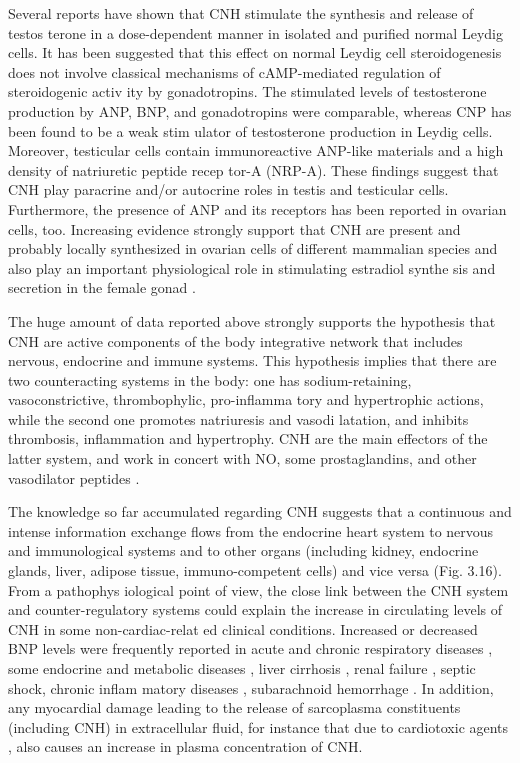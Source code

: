 \documentclass[14pt,a4paper,onecolumn]{extarticle}
\begin{document}
Several reports have shown that CNH stimulate the synthesis and release of testos terone in a dose-dependent manner in isolated and purified normal Leydig cells. It has been suggested that this effect on normal Leydig cell steroidogenesis does not involve classical mechanisms of cAMP-mediated regulation of steroidogenic activ ity by gonadotropins. The stimulated levels of testosterone production by ANP, BNP, and gonadotropins were comparable, whereas CNP has been found to be a weak stim ulator of testosterone production in Leydig cells. Moreover, testicular cells contain immunoreactive ANP-like materials and a high density of natriuretic peptide recep tor-A (NRP-A). These findings suggest that CNH play paracrine and/or autocrine roles in testis and testicular cells. Furthermore, the presence of ANP and its receptors has been reported in ovarian cells, too. Increasing evidence strongly support that CNH are present and probably locally synthesized in ovarian cells of different mammalian species and also play an important physiological role in stimulating estradiol synthe sis and secretion in the female gonad \citep{112}.

The huge amount of data reported above strongly supports the hypothesis that CNH are active components of the body integrative network that includes nervous, endocrine and immune systems. This hypothesis implies that there are two counteracting systems in the body: one has sodium-retaining, vasoconstrictive, thrombophylic, pro-inflamma tory and hypertrophic actions, while the second one promotes natriuresis and vasodi latation, and inhibits thrombosis, inflammation and hypertrophy. CNH are the main effectors of the latter system, and work in concert with NO, some prostaglandins, and other vasodilator peptides \citep{119} \citep{120}.

The knowledge so far accumulated regarding CNH suggests that a continuous and intense information exchange flows from the endocrine heart system to nervous and immunological systems and to other organs (including kidney, endocrine glands, liver, adipose tissue, immuno-competent cells) and vice versa (Fig. 3.16). From a pathophys iological point of view, the close link between the CNH system and counter-regulatory systems could explain the increase in circulating levels of CNH in some non-cardiac-relat ed clinical conditions. Increased or decreased BNP levels were frequently reported in acute and chronic respiratory diseases \citep{121} \citep{122} \citep{123} \citep{124} \citep{126} \citep{127} \citep{128} \citep{129},
 some endocrine and metabolic diseases \citep{141}, liver cirrhosis \citep{142} \citep{143} \citep{144}, renal failure \citep{100} \citep{144}, septic shock, chronic inflam matory diseases \citep{145} \citep{146} \citep{61} \citep{149}, subarachnoid hemorrhage \citep{150} \citep{153}. In addition, any myocardial damage leading to the release of sarcoplasma constituents (including CNH) in extracellular fluid, for instance that due to cardiotoxic agents \citep{157} \citep{161}, also causes an increase in plasma concentration of CNH.
\end{document}
